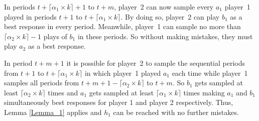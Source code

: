 \documentclass[11.5pt]{article}
\begin{document}
\begin{table}[htbp]
\centering
{}
\end{table}


In periods $t+\lceil \alpha_1 \times k \rceil + 1$ to $t + m$, player~2 can now sample every $a_1$ player~1 played in periods $t+1$ to $t+\lceil \alpha_1 \times k \rceil$. By doing so, player~2 can play $b_1$ as a best response in every period. Meanwhile, player~1 can sample no more than $\lceil \alpha_2 \times k \rceil - 1$ plays of $b_1$ in these periods. So without making mistakes, they must play $a_2$ as a best response.

In period $t + m + 1$ it is possible for player~2 to sample the sequential periods from $t + 1$ to $t + \lceil \alpha_1 \times k \rceil$ in which player~1 played $a_1$ each time while player~1 samples all periods from $t+m+1-\lceil \alpha_2 \times k \rceil$ to $t + m$. So $b_1$ gets sampled at least $\lceil \alpha_2 \times k \rceil$ times and $a_1$ gets sampled at least $\lceil \alpha_1 \times k \rceil$ times making $a_1$ and $b_1$ simultaneously best responses for player 1 and player 2 respectively. Thus, Lemma \ref{Lemma_1} applies and $h_1$ can be reached with no further mistakes. 
\end{document}
